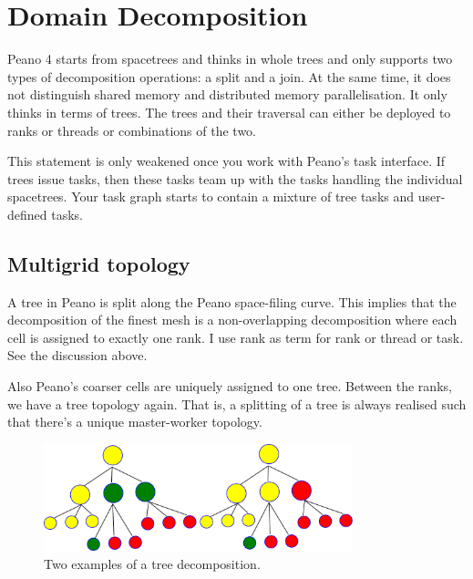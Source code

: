 \chapter{Domain Decomposition}
\label{section:design:domain-decomposition}

Peano 4 starts from spacetrees and thinks in whole trees and only supports two
types of decomposition operations: a split and a join.
At the same time, it does not distinguish shared memory and distributed memory
parallelisation.
It only thinks in terms of trees.
The trees and their traversal can either be deployed to ranks or threads or
combinations of the two.

This statement is only weakened once you work with Peano's task interface. 
If trees issue tasks, then these tasks team up with the tasks handling the
individual spacetrees.
Your task graph starts to contain a mixture of tree tasks and user-defined
tasks.


\section{Multigrid topology}

A tree in Peano is split along the Peano space-filing curve.
This implies that the decomposition of the finest mesh is a non-overlapping
decomposition where each cell is assigned to exactly one rank.
I use rank as term for rank or thread or task. 
See the discussion above.


Also Peano's coarser cells are uniquely assigned to one tree. 
Between the ranks, we have a tree topology again. 
That is, a splitting of a tree is always realised such that there's a unique
master-worker topology.

\begin{figure}
  \begin{center}
    \includegraphics[width=0.8\textwidth]{51_domain-decomposition/tree-topology.pdf}
  \end{center}
  \caption{
    Two examples of a tree decomposition.
    \label{figure:51_domain-decomposition:tree-topology}
  }
\end{figure}

